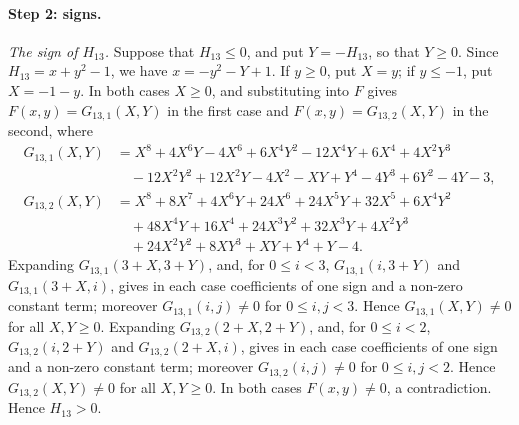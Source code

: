 \documentclass[11pt]{article}
\begin{document}
\paragraph{Step 2: signs.} \emph{The sign of $H_{13}$.} Suppose that $H_{13}\leq0$, and put $Y=-H_{13}$, so that $Y\geq0$. Since $H_{13}=x+y^{2}-1$, we have $x=-y^{2}-Y+1$. If $y\geq0$, put $X=y$; if $y\leq-1$, put $X=-1-y$. In both cases $X\geq0$, and substituting into $F$ gives $F(x,y)=G_{13,1}(X,Y)$ in the first case and $F(x,y)=G_{13,2}(X,Y)$ in the second, where
\begin{align*}
G_{13,1}(X,Y)&=X^{8}+4X^{6}Y-4X^{6}+6X^{4}Y^{2}-12X^{4}Y+6X^{4}+4X^{2}Y^{3}\\
&\quad-12X^{2}Y^{2}+12X^{2}Y-4X^{2}-XY+Y^{4}-4Y^{3}+6Y^{2}-4Y-3,\\
G_{13,2}(X,Y)&=X^{8}+8X^{7}+4X^{6}Y+24X^{6}+24X^{5}Y+32X^{5}+6X^{4}Y^{2}\\
&\quad+48X^{4}Y+16X^{4}+24X^{3}Y^{2}+32X^{3}Y+4X^{2}Y^{3}\\
&\quad+24X^{2}Y^{2}+8XY^{3}+XY+Y^{4}+Y-4.
\end{align*}
Expanding $G_{13,1}(3+X,3+Y)$, and, for $0\leq i<3$, $G_{13,1}(i,3+Y)$ and $G_{13,1}(3+X,i)$, gives in each case coefficients of one sign and a non-zero constant term; moreover $G_{13,1}(i,j)\neq0$ for $0\leq i,j<3$. Hence $G_{13,1}(X,Y)\neq0$ for all $X,Y\geq0$. Expanding $G_{13,2}(2+X,2+Y)$, and, for $0\leq i<2$, $G_{13,2}(i,2+Y)$ and $G_{13,2}(2+X,i)$, gives in each case coefficients of one sign and a non-zero constant term; moreover $G_{13,2}(i,j)\neq0$ for $0\leq i,j<2$. Hence $G_{13,2}(X,Y)\neq0$ for all $X,Y\geq0$. In both cases $F(x,y)\neq0$, a contradiction. Hence $H_{13}>0$.
\end{document}
